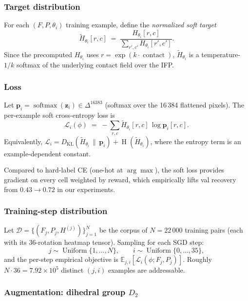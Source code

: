 \documentclass[11pt]{article}
\begin{document}
\subsubsection{Target distribution}\label{sec:target}

For each $(F, P, \theta_i)$ training example, define the \emph{normalized soft target}
\[
  \tilde{H}_{\theta_i}[r,c] \;=\; \frac{H_{\theta_i}[r,c]}{\sum_{r',c'} H_{\theta_i}[r',c']}.
\]
Since the precomputed $H_{\theta_i}$ uses $r = \exp(k \cdot \operatorname{contact})$, $\tilde{H}_{\theta_i}$ is a temperature-$1/k$ softmax of the underlying contact field over the IFP.

\subsubsection{Loss}

Let $\mathbf{p}_i = \operatorname{softmax}(\mathbf{z}_i) \in \Delta^{16383}$ (softmax over the 16\,384 flattened pixels).  The per-example soft cross-entropy loss is
\[
  \mathcal{L}_i(\phi) \;=\; -\sum_{r,c} \tilde{H}_{\theta_i}[r,c] \, \log \mathbf{p}_i[r,c].
\]
Equivalently, $\mathcal{L}_i = D_{\operatorname{KL}}(\tilde H_{\theta_i} \,\|\, \mathbf{p}_i) + \operatorname{H}(\tilde H_{\theta_i})$, where the entropy term is an example-dependent constant.

Compared to hard-label CE (one-hot at $\arg\max$), the soft loss provides gradient on every cell weighted by reward, which empirically lifts val recovery from $0.43 \to 0.72$ in our experiments.

\subsubsection{Training-step distribution}

Let $\mathcal{D} = \{(F_j, P_j, H^{(j)})\}_{j=1}^{N}$ be the corpus of $N = 22\,000$ training pairs (each with its 36-rotation heatmap tensor).  Sampling for each SGD step:
\[
  j \sim \operatorname{Uniform}\{1, \dots, N\}, \qquad i \sim \operatorname{Uniform}\{0, \dots, 35\},
\]
and the per-step empirical objective is $\mathbb{E}_{j,i}[\mathcal{L}_{i}(\phi; F_j, P_j)]$.  Roughly $N \cdot 36 = 7.92 \times 10^5$ distinct $(j, i)$ examples are addressable.

\subsubsection{Augmentation: dihedral group $D_2$}
\end{document}
